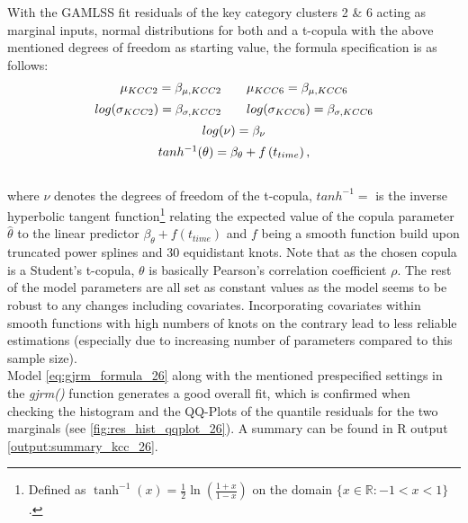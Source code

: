 With the \ac{GAMLSS} fit residuals of the key category clusters 2 \& 6 acting as marginal inputs, normal distributions for both and a t-copula with the above mentioned degrees of freedom as starting value, the formula specification is as follows: \\



\begin{equation}
\begin{array}{c}
\mu_{KCC 2}=\beta_{\mu,KCC2} \qquad \mu_{KCC 6}=\beta_{\mu,KCC6}  \\  \noalign{\vskip5pt}

log(\sigma_{KCC 2})=\beta_{\sigma,KCC2} \qquad log(\sigma_{KCC 6})=\beta_{\sigma,KCC6} \\  \noalign{\vskip5pt}

log(\nu) = \beta_{\nu} \\  \noalign{\vskip5pt}

tanh^{-1}(\theta)=\beta_{\theta}+f\left(t_{time}\right),
\end{array}
\label{eq:gjrm_formula_26}
\end{equation} \\

where $\nu$ denotes the degrees of freedom of the t-copula, $tanh^{-1} = $ is the inverse hyperbolic tangent function\footnote{Defined as $\tanh ^{-1} (x)=\frac{1}{2} \ln \left(\frac{1+x}{1-x}\right)$ on the domain $ \{ x \in \mathbb{R}:-1<x<1\}$.} relating the expected value of the copula parameter $\hat{\theta}$ to the linear predictor $\beta_{\theta}+f\left(t_{time}\right)$ and $f$ being a smooth function build upon truncated power splines and 30 equidistant knots. Note that as the chosen copula is a Student's t-copula, $\theta$ is basically Pearson's correlation coefficient $\rho$. The rest of the model parameters are all set as constant values as the model seems to be robust to any changes including covariates. Incorporating covariates within smooth functions with high numbers of knots on the contrary lead to less reliable estimations (especially due to increasing number of parameters compared to this sample size). \\

Model \ref{eq:gjrm_formula_26} along with the mentioned prespecified settings in the \textit{gjrm()} function generates a good overall fit, which is confirmed when checking the histogram and the QQ-Plots of the quantile residuals for the two marginals (see \autoref{fig:res_hist_qqplot_26}). A summary can be found in R output \ref{output:summary_kcc_26}.
\\


